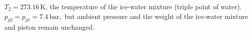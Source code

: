 \( T_2 = 273.16 \, \text{K} \), the temperature of the ice-water mixture (triple point of water).  
\( p_{g2} = p_{g1} = 7.4 \, \text{bar}, \) but ambient pressure and the weight of the ice-water mixture and piston remain unchanged.